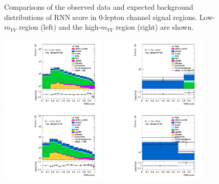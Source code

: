 \begin{figure}[]
      \caption{Comparisons of the observed data and expected background distributions of RNN score in 0-lepton channel signal regions. Low-$m_{VV}$ region (left) and the high-$m_{VV}$ region (right) are shown.}
      \label{fig:postSR0lepaQGC}
\end{figure}
\begin{figure}[]
    \centering
    \includegraphics[width=0.45\textwidth]{figures/aQGC/PostFit/Region_distRNN_DSRVBSHPLMlvJ1500_BMin0_J0_incJet1_L1_T0_incFat1_Y6051_incTag1_Fat1_GlobalFit_unconditionnal_mu1log}
    \includegraphics[width=0.45\textwidth]{figures/aQGC/PostFit/Region_distRNN_DSRVBSHPHMlvJ1500_BMin0_J0_incJet1_L1_T0_incFat1_Y6051_incTag1_Fat1_GlobalFit_unconditionnal_mu1log}
    \includegraphics[width=0.45\textwidth]{figures/aQGC/PostFit/Region_distRNN_DSRVBSLPLMlvJ1500_BMin0_J0_incJet1_L1_T0_incFat1_Y6051_incTag1_Fat1_GlobalFit_unconditionnal_mu1log}
    \includegraphics[width=0.45\textwidth]{figures/aQGC/PostFit/Region_distRNN_DSRVBSLPHMlvJ1500_BMin0_J0_incJet1_L1_T0_incFat1_Y6051_incTag1_Fat1_GlobalFit_unconditionnal_mu1log}

\end{figure}
